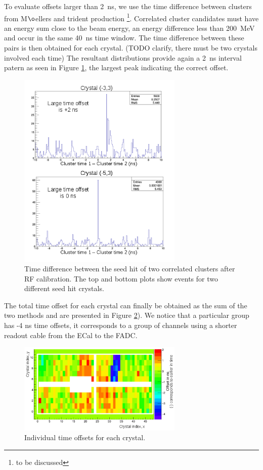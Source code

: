 \documentclass[review]{elsarticle}
\begin{document}
To evaluate offsets larger than 2~ns, we use the time difference between 
clusters from M$\o$ellers and trident production \footnote{to be discussed}. 
Correlated cluster candidates must have an energy sum close to the beam energy, 
an energy difference less than 200~MeV and occur in the same 40~ns time window. 
The time difference between these pairs is then obtained for each crystal. 
(TODO clarify, there must be two crystals involved each time) The 
resultant distributions provide again a 2~ns interval patern as seen in 
Figure \ref{LargeOffset}, the largest peak indicating the correct offset.

\begin{figure}[ht!]
\centering
\includegraphics[width=0.70\textwidth]{pairsProcedure.png}
\caption{Time difference between the seed hit of two correlated clusters after 
RF calibration. The top and bottom plots show events for two different seed hit crystals.}
\label{LargeOffset}
\end{figure}

The total time offset for each crystal can finally be obtained as the sum of 
the two methods and are presented in Figure \ref{TimeOffset}). We notice that a
particular group has -4 ns time offsets, it corresponds to a group of channels 
using a shorter readout cable from the ECal to the FADC.


\begin{figure}[ht!]
\centering
\includegraphics[width=0.70\textwidth]{TimeOffset.png}
\caption{Individual time offsets for each crystal.}
\label{TimeOffset}
\end{figure}
\end{document}
